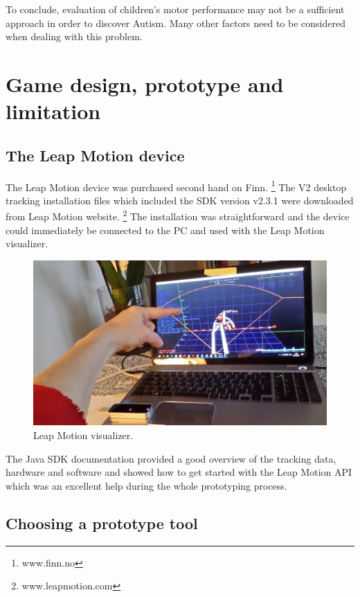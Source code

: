 To conclude, evaluation of children's motor performance may not be a sufficient approach in order to discover Autism. Many other factors need to be considered when dealing with this problem. 



\section{Game design, prototype and limitation}
\label{sec:prototype}


\subsection{The Leap Motion device}

The Leap Motion device was purchased second hand on Finn. \footnote{www.finn.no} The V2 desktop tracking installation files which included the SDK version v2.3.1 were downloaded from Leap Motion website. \footnote{www.leapmotion.com} The installation was straightforward and the device could immediately be connected to the PC and used with the Leap Motion visualizer.

\begin{figure}[h]  %
  \centering
  \includegraphics[width=.5\textwidth]{figures/LMvisualizer.jpg}
  \caption[Leap Motion visualizer.]{Leap Motion visualizer.}
  \label{fig:LMvisualizer}
\end{figure}

The Java SDK documentation provided a good overview of the tracking data, hardware and software and showed how to get started with the Leap Motion API which was an excellent help during the whole prototyping process.

\subsection{Choosing a prototype tool}

